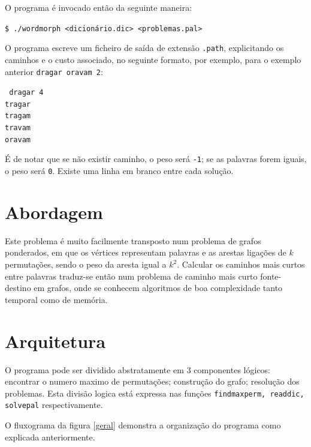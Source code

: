 \documentclass[portuguese, a4paper]{article}
\newcommand\tu[0]{\textunderscore}
\begin{document}
	\par
	O programa é invocado então da seguinte maneira:
	\begin{center}
		\texttt{\$ ./wordmorph <dicionário.dic> <problemas.pal>}
	\end{center}
	\par
	O programa escreve um ficheiro de saída de extensão \texttt{.path},
	explicitando os caminhos e o custo associado, no seguinte formato, por
	exemplo, para o exemplo anterior \texttt{dragar oravam 2}:
	\begin{center}
		\texttt{
		dragar 4\\
		tragar \\
		tragam \\
		travam \\
		oravam}
	\end{center}
	\par
	É de notar que se não existir caminho, o peso será \texttt{-1}; se as
	palavras forem iguais, o peso será \texttt{0}. Existe uma linha em branco
	entre cada solução.


\section{Abordagem}
	\par
	Este problema é muito facilmente transposto num problema de grafos
	ponderados, em que os vértices representam palavras e as arestas ligações
	de $k$ permutações, sendo o peso da aresta igual a $k^2$.  Calcular os
	caminhos mais curtos entre palavras traduz-se então num problema de caminho
	mais curto fonte-destino em grafos, onde se conhecem algoritmos de boa
	complexidade tanto temporal como de memória.


\section{Arquitetura}
	\par
	O programa pode ser dividido abstratamente em 3 componentes lógicos:
	encontrar o numero maximo de permutações; construção do grafo; resolução dos
	problemas. Esta divisão logica está expressa nas funções
	\texttt{find\tu max\tu perm, read\tu dic, solve\tu pal} respectivamente.

	\par
	O fluxograma da figura \ref{geral} demonstra a organização do programa como
	explicada anteriormente.
\end{document}
